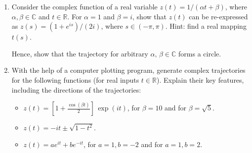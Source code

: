 \documentclass[10pt,a4paper]{article}
\begin{document}
\begin{enumerate}
\item
  Consider the complex function of a real variable $z(t) = 1/(\alpha t
  + \beta)$, where $\alpha, \beta \in \mathbb{C}$ and $t \in
  \mathbb{R}$.  For $\alpha = 1$ and $\beta = i$, show that $z(t)$ can
  be re-expressed as $z(s) = (1+e^{is})/(2i)$, where $s \in
  (-\pi,\pi)$.  Hint: find a real mapping $t(s)$.

  Hence, show that the trajectory for arbitrary $\alpha,\, \beta \in
  \mathbb{C}$ forms a circle.

\item
  With the help of a computer plotting program, generate complex
  trajectories for the following functions (for real inputs $t
  \in\mathbb{R}$). Explain their key features, including the
  directions of the trajectories:
  \begin{itemize}
  \item
    $z(t) = \left[1+\frac{\cos(\beta t)}{2}\right] \, \exp(it)$, for
$\beta = 10$ and for $\beta = \sqrt{5}$.
  \item
$z(t) = -it \pm \sqrt{1 - t^2}$.
    \item
$z(t) = ae^{it} + be^{-it}$, for $a = 1, b = -2$ and for
$a = 1, b = 2$.
  \end{itemize}
\end{enumerate}
\end{document}
